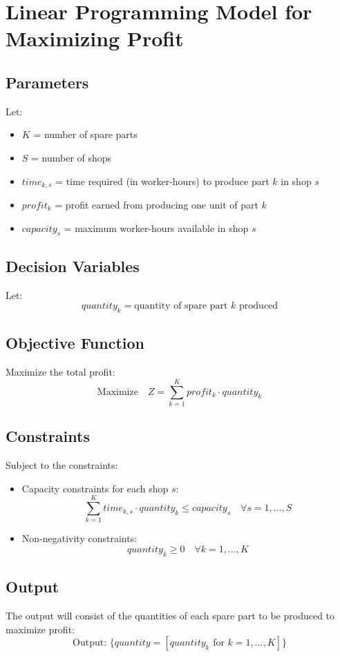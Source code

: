 \documentclass{article}
\begin{document}
\section*{Linear Programming Model for Maximizing Profit}

\subsection*{Parameters}
Let:
\begin{itemize}
    \item \( K \) = number of spare parts
    \item \( S \) = number of shops
    \item \( time_{k,s} \) = time required (in worker-hours) to produce part \( k \) in shop \( s \) 
    \item \( profit_{k} \) = profit earned from producing one unit of part \( k \)
    \item \( capacity_{s} \) = maximum worker-hours available in shop \( s \)
\end{itemize}

\subsection*{Decision Variables}
Let:
\[
quantity_k = \text{quantity of spare part } k \text{ produced}
\]

\subsection*{Objective Function}
Maximize the total profit:
\[
\text{Maximize} \quad Z = \sum_{k=1}^{K} profit_k \cdot quantity_k
\]

\subsection*{Constraints}
Subject to the constraints:
\begin{itemize}
    \item Capacity constraints for each shop \( s \):
    \[
    \sum_{k=1}^{K} time_{k,s} \cdot quantity_k \leq capacity_s \quad \forall s = 1, \ldots, S
    \]
    
    \item Non-negativity constraints:
    \[
    quantity_k \geq 0 \quad \forall k = 1, \ldots, K
    \]
\end{itemize}

\subsection*{Output}
The output will consist of the quantities of each spare part to be produced to maximize profit:
\[
\text{Output: } \{ quantity = [quantity_k \text{ for } k = 1, \ldots, K] \}
\]
\end{document}
